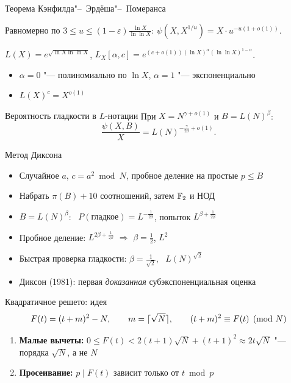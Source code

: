 \documentclass{ca-slides}
\begin{document}
\begin{canvasframe}{Теорема Кэнфилда"--~Эрдёша"--~Померанса}
  \begin{theorem}
    Равномерно по $3 \le u \le (1 - \varepsilon)\frac{\ln X}{\ln\ln X}$:
    \quad $\psi(X, X^{1/u}) = X \cdot u^{-u(1 + o(1))}$.
  \end{theorem}
  \begin{definition}
    $L(X) = e^{\sqrt{\ln X \ln\ln X}}$, \qquad
    $L_X[\alpha, c] = e^{(c + o(1))(\ln X)^{\alpha}(\ln\ln X)^{1 - \alpha}}$.
  \end{definition}
  \begin{itemize}
    \item $\alpha = 0$ "--- полиномиально по $\ln X$, $\alpha = 1$ "--- экспоненциально
    \item $L(X)^c = X^{o(1)}$
  \end{itemize}
\end{canvasframe}

\begin{theoremframe}[corollary]{Вероятность гладкости в $L$-нотации}
  При $X = N^{\gamma + o(1)}$ и $B = L(N)^{\beta}$:
  \[\frac{\psi(X, B)}{X} = L(N)^{-\frac{\gamma}{2\beta} + o(1)}.\]
\end{theoremframe}

\begin{canvasframe}{Метод Диксона}
  \begin{itemize}
    \item Случайное $a$, $c = a^2 \bmod N$, пробное деление на простые $p \le B$
    \item Набрать $\pi(B) + 10$ соотношений, затем $\mathbb{F}_{2}$ и НОД
    \item $B = L(N)^{\beta}$: \ $P(\text{гладкое}) = L^{-\frac{1}{2\beta}}$, попыток
      $L^{\beta + \frac{1}{2\beta}}$
    \item Пробное деление: $L^{2\beta + \frac{1}{2\beta}}$ $\Rightarrow$ $\beta = \frac12$, $L^{2}$
    \item Быстрая проверка гладкости: $\beta = \frac{1}{\sqrt2}$, \ $L(N)^{\sqrt2}$
    \item Диксон (1981): первая \emph{доказанная} субэкспоненциальная оценка
  \end{itemize}
  \vfill
\end{canvasframe}

\begin{canvasframe}{Квадратичное решето: идея}
  \[F(t) = (t + m)^2 - N, \qquad m = \lceil\sqrt N\rceil, \qquad
    (t + m)^2 \equiv F(t) \pmod N\]
  \begin{enumerate}
    \item \textbf{Малые вычеты:} $0 \le F(t) < 2(t + 1)\sqrt N + (t + 1)^2 \approx 2t\sqrt N$
      "--- порядка $\sqrt N$, а не $N$
    \item \textbf{Просеивание:} $p \mid F(t)$ зависит только от $t \bmod p$
  \end{enumerate}
  \vfill
\end{canvasframe}
\end{document}
